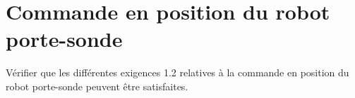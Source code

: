 \section{Commande en position du robot porte-sonde}
\begin{obj}
Vérifier que les différentes exigences 1.2 relatives à la commande en position du robot porte-sonde peuvent être satisfaites.
\end{obj}
%
%
%

